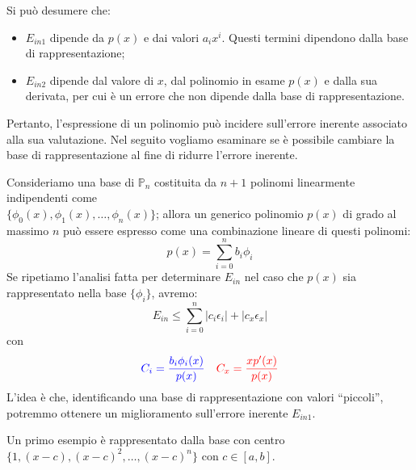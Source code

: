 \documentclass{article}
\begin{document}
Si può desumere che:
\begin{itemize}
    \item $E_{in1}$ dipende da $p(x)$ e dai valori $a_ix^i$. Questi termini dipendono
   dalla base di rappresentazione;
   \item $E_{in2}$ dipende dal valore di $x$, dal polinomio in esame $p(x)$ e
       dalla sua derivata, per cui è un errore che non dipende dalla
       base di rappresentazione.
\end{itemize}
Pertanto, l'espressione di un polinomio può incidere sull'errore inerente
associato alla sua valutazione. Nel seguito vogliamo esaminare se è possibile
cambiare la base di rappresentazione al fine di ridurre l'errore inerente.

Consideriamo una base di $\mathbb{P}_n$ costituita da $n+1$ polinomi
linearmente indipendenti come \\$\{\phi_0(x),\phi_1(x),\ldots,\phi_n(x)\}$; allora
un generico polinomio $p(x)$ di grado al massimo $n$ 
può essere espresso come una combinazione lineare di questi polinomi:
$$p(x)=\displaystyle\sum_{i=0}^{n}b_i\phi_i$$
Se ripetiamo l'analisi fatta per determinare $E_{in}$ nel caso che $p(x)$ sia
rappresentato nella base $\{\phi_i\}$, avremo: 
$$E_{in}\leq \displaystyle\sum_{i=0}^{n}\left\lvert
c_i\epsilon_i\right\rvert+\left\lvert c_x\epsilon_x\right\rvert$$
con 
\begin{equation*}
   \begin{aligned}
       & {\color{blue}C_i=\frac{b_i\phi_i(x)}{p(x)}} &
       {\color{red}C_x=\frac{xp'(x)}{p(x)}}
   \end{aligned} 
\end{equation*}
L'idea è che, identificando una base di rappresentazione con valori
``piccoli'', potremmo ottenere un miglioramento sull'errore inerente $E_{in1}$.
\begin{example}
    Un primo esempio è rappresentato dalla base con centro
    $\{1,(x-c),(x-c)^2,\ldots,(x-c)^n\}$ con $c\in[a,b]$.
\end{example}
\end{document}
